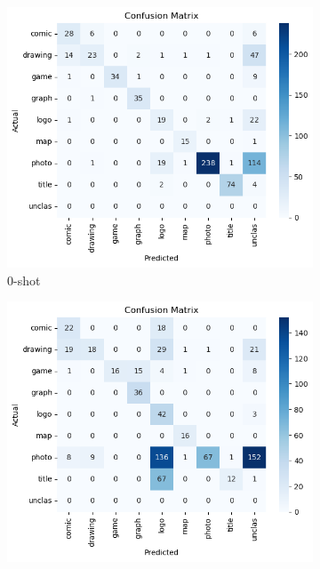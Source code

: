 \begin{figure}[ht]
    \centering

    \begin{subfigure}{0.31\textwidth}
       \includegraphics[width=\linewidth]{Images/cm-flam-p2-0s.png}
        \caption{0-shot}
        \label{fig:cm-p2-0s}
    \end{subfigure}
    \hfill
    \begin{subfigure}{0.31\textwidth}
        \includegraphics[width=\linewidth]{Images/cm-flam-p2-1s.png}

\end{subfigure}
\end{figure}
